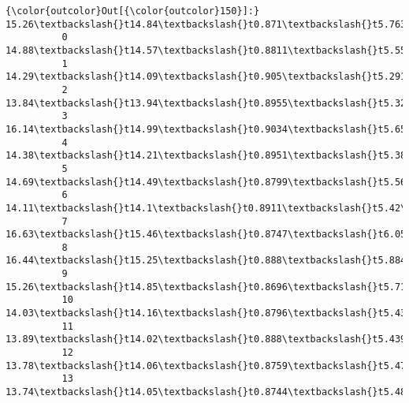 \documentclass[11pt]{article}
\begin{document}
\begin{Verbatim}[commandchars=\\\{\}]
{\color{outcolor}Out[{\color{outcolor}150}]:}      15.26\textbackslash{}t14.84\textbackslash{}t0.871\textbackslash{}t5.763\textbackslash{}t3.312\textbackslash{}t2.221\textbackslash{}t5.22\textbackslash{}t1
          0    14.88\textbackslash{}t14.57\textbackslash{}t0.8811\textbackslash{}t5.554\textbackslash{}t3.333\textbackslash{}t1.018\textbackslash{}t4.9{\ldots}
          1    14.29\textbackslash{}t14.09\textbackslash{}t0.905\textbackslash{}t5.291\textbackslash{}t3.337\textbackslash{}t2.699\textbackslash{}t4.82{\ldots}
          2    13.84\textbackslash{}t13.94\textbackslash{}t0.8955\textbackslash{}t5.324\textbackslash{}t3.379\textbackslash{}t2.259\textbackslash{}t4.8{\ldots}
          3    16.14\textbackslash{}t14.99\textbackslash{}t0.9034\textbackslash{}t5.658\textbackslash{}t3.562\textbackslash{}t1.355\textbackslash{}t5.1{\ldots}
          4    14.38\textbackslash{}t14.21\textbackslash{}t0.8951\textbackslash{}t5.386\textbackslash{}t3.312\textbackslash{}t2.462\textbackslash{}t4.9{\ldots}
          5    14.69\textbackslash{}t14.49\textbackslash{}t0.8799\textbackslash{}t5.563\textbackslash{}t3.259\textbackslash{}t3.586\textbackslash{}t5.2{\ldots}
          6      14.11\textbackslash{}t14.1\textbackslash{}t0.8911\textbackslash{}t5.42\textbackslash{}t3.302\textbackslash{}t2.7\textbackslash{}t\textbackslash{}t5\textbackslash{}t\textbackslash{}t1
          7    16.63\textbackslash{}t15.46\textbackslash{}t0.8747\textbackslash{}t6.053\textbackslash{}t3.465\textbackslash{}t2.04\textbackslash{}t5.87{\ldots}
          8    16.44\textbackslash{}t15.25\textbackslash{}t0.888\textbackslash{}t5.884\textbackslash{}t3.505\textbackslash{}t1.969\textbackslash{}t5.53{\ldots}
          9    15.26\textbackslash{}t14.85\textbackslash{}t0.8696\textbackslash{}t5.714\textbackslash{}t3.242\textbackslash{}t4.543\textbackslash{}t5.3{\ldots}
          10   14.03\textbackslash{}t14.16\textbackslash{}t0.8796\textbackslash{}t5.438\textbackslash{}t3.201\textbackslash{}t1.717\textbackslash{}t5.0{\ldots}
          11   13.89\textbackslash{}t14.02\textbackslash{}t0.888\textbackslash{}t5.439\textbackslash{}t3.199\textbackslash{}t3.986\textbackslash{}t4.73{\ldots}
          12   13.78\textbackslash{}t14.06\textbackslash{}t0.8759\textbackslash{}t5.479\textbackslash{}t3.156\textbackslash{}t3.136\textbackslash{}t4.8{\ldots}
          13   13.74\textbackslash{}t14.05\textbackslash{}t0.8744\textbackslash{}t5.482\textbackslash{}t3.114\textbackslash{}t2.932\textbackslash{}t4.8{\ldots}

\end{Verbatim}
\end{document}
